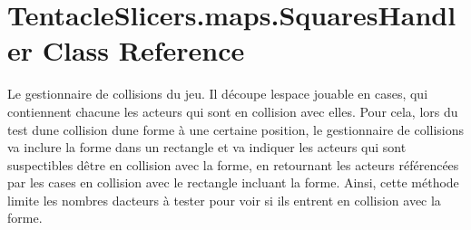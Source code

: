 \hypertarget{class_tentacle_slicers_1_1maps_1_1_squares_handler}{}\section{Tentacle\+Slicers.\+maps.\+Squares\+Handler Class Reference}
\label{class_tentacle_slicers_1_1maps_1_1_squares_handler}


Le gestionnaire de collisions du jeu. Il découpe l\textquotesingle{}espace jouable en cases, qui contiennent chacune les acteurs qui sont en collision avec elles. Pour cela, lors du test d\textquotesingle{}une collision d\textquotesingle{}une forme à une certaine position, le gestionnaire de collisions va inclure la forme dans un rectangle et va indiquer les acteurs qui sont suspectibles d\textquotesingle{}être en collision avec la forme, en retournant les acteurs référencées par les cases en collision avec le rectangle incluant la forme. Ainsi, cette méthode limite les nombres d\textquotesingle{}acteurs à tester pour voir si ils entrent en collision avec la forme.  


